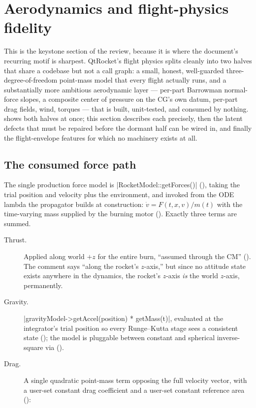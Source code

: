 \section{Aerodynamics and flight-physics fidelity}\label{sec:aero}

This is the keystone section of the review, because it is where the document's recurring motif is
sharpest. QtRocket's flight physics splits cleanly into two halves that share a codebase but not a
call graph: a small, honest, well-guarded three-degree-of-freedom point-mass model that every
flight actually runs, and a substantially more ambitious aerodynamic layer --- per-part Barrowman
normal-force slopes, a composite center of pressure on the CG's own datum, per-part drag fields,
wind, torques --- that is built, unit-tested, and consumed by nothing. 
shows both halves at once; this section describes each precisely, then the latent defects that
must be repaired before the dormant half can be wired in, and finally the flight-envelope features
for which no machinery exists at all.


\subsection{The consumed force path}\label{sec:aero-consumed}

The single production force model is \cppinline|RocketModel::getForces()|
(), taking the trial position and velocity plus the environment,
and invoked from the ODE lambda the propagator builds at construction:
$\dot{v} = F(t,x,v)/m(t)$ with the time-varying mass supplied by the burning motor
(). Exactly three terms are summed.

\begin{description}
  \item[Thrust.] Applied along world $+z$ for the entire burn, ``assumed through the CM''
  (). The comment says ``along the rocket's $z$-axis,'' but since no
  attitude state exists anywhere in the dynamics, the rocket's $z$-axis \emph{is} the world
  $z$-axis, permanently.
  \item[Gravity.] \cppinline|gravityModel->getAccel(position) * getMass(t)|, evaluated at the
  integrator's trial position so every Runge--Kutta stage sees a consistent state
  (); the model is pluggable between constant and spherical
  inverse-square via  ().
  \item[Drag.] A single quadratic point-mass term opposing the full velocity vector, with a
  user-set constant drag coefficient and a user-set constant reference area
  ():
\end{description}

